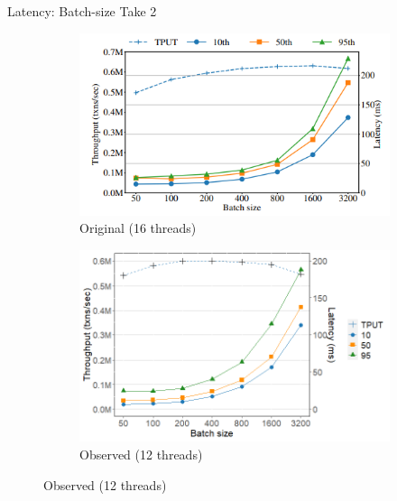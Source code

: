 \documentclass[xcolor=dvipsnames]{beamer}
\begin{document}
    \begin{frame}{Latency: Batch-size Take 2}
        \begin{figure}
            \begin{subfigure}[h]{0.4\linewidth}
                \includegraphics[scale=0.50]{rolis_fig16.png}
                \caption{Original (16 threads)}
            \end{subfigure}
            \hfill
            \begin{subfigure}[h]{0.5\linewidth}
                \includegraphics[scale=0.30]{fig16_12t.png}
                \caption{Observed (12 threads)}
            \end{subfigure}
        \end{figure}
    \end{frame}
\end{document}
